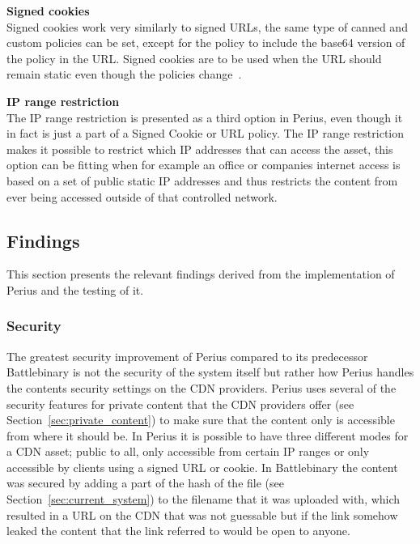 \documentclass[a4paper,12pt]{article}
\begin{document}
\par \textbf{Signed cookies} \\
Signed cookies work very similarly to signed URLs, the same type of canned and custom policies can
be set, except for the policy to include the base64 version of the policy in the URL. Signed cookies
are to be used when the URL should remain static even though the policies change~\cite{AWSCOOKIES}.
\\

\par \textbf{IP range restriction} \\
The IP range restriction is presented as a third option in Perius, even though it in fact is just a
part of a Signed Cookie or URL policy. The IP range restriction makes it possible to restrict which
IP addresses that can access the asset, this option can be fitting when for example an office or
companies internet access is based on a set of public static IP addresses and thus restricts the
content from ever being accessed outside of that controlled network.

\subsection{Findings}
This section presents the relevant findings derived from the implementation of Perius and the 
testing of it.  

\subsubsection{Security}
The greatest security improvement of Perius compared to its predecessor Battlebinary is not the
security of the system itself but rather how Perius handles the contents security settings on the
CDN providers. Perius uses several of the security features for private content that the CDN
providers offer (see Section~\ref{sec:private_content}) to make sure that the content only is
accessible from where it should be. In Perius it is possible to have three different modes for a CDN
asset; public to all, only accessible from certain IP ranges or only accessible by clients using a
signed URL or cookie. In Battlebinary the content was secured by adding a part of the hash of the
file (see Section~\ref{sec:current_system}) to the filename that it was uploaded with, which
resulted in a URL on the CDN that was not guessable but if the link somehow leaked the content that
the link referred to would be open to anyone.

\end{document}
